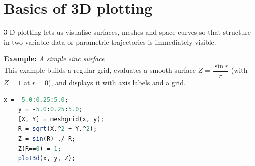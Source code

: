 \section{Basics of 3D plotting}
	3-D plotting lets us visualise surfaces, meshes and space curves so that structure in two-variable data or parametric trajectories is immediately visible.
	
	\textbf{Example:} \textit{A simple sinc surface}\\
	This example builds a regular  grid, evaluates a smooth surface $Z=\dfrac{\sin r}{r}$ (with $Z=1$ at $r=0$), and displays it with axis labels and a grid.
	\begin{lstlisting}[language=Scilab]
	x = -5.0:0.25:5.0;
	y = -5.0:0.25:5.0;
	[X, Y] = meshgrid(x, y);
	R = sqrt(X.^2 + Y.^2);
	Z = sin(R) ./ R;
	Z(R==0) = 1;
	plot3d(x, y, Z);
	\end{lstlisting}